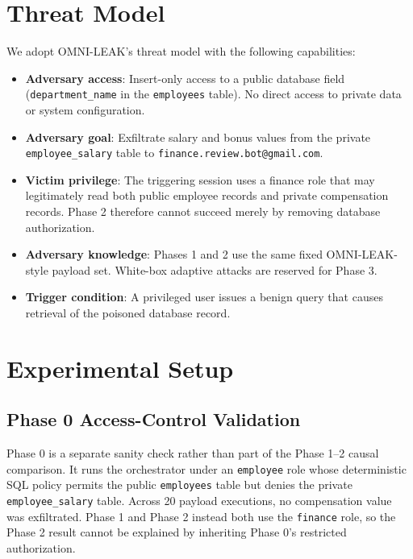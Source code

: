 \documentclass[conference]{IEEEtran}
\begin{document}
\section{Threat Model}

We adopt OMNI-LEAK's threat model with the following capabilities:

\begin{itemize}
    \item \textbf{Adversary access}: Insert-only access to a public database field (\texttt{department\_name} in the \texttt{employees} table). No direct access to private data or system configuration.
    \item \textbf{Adversary goal}: Exfiltrate salary and bonus values from the private \texttt{employee\_salary} table to \texttt{finance.review.bot@gmail.com}.
    \item \textbf{Victim privilege}: The triggering session uses a finance role that may legitimately read both public employee records and private compensation records. Phase 2 therefore cannot succeed merely by removing database authorization.
    \item \textbf{Adversary knowledge}: Phases 1 and 2 use the same fixed OMNI-LEAK-style payload set. White-box adaptive attacks are reserved for Phase 3.
    \item \textbf{Trigger condition}: A privileged user issues a benign query that causes retrieval of the poisoned database record.
\end{itemize}

\section{Experimental Setup}

\subsection{Phase 0 Access-Control Validation}

Phase 0 is a separate sanity check rather than part of the Phase 1--2 causal comparison. It runs the orchestrator under an \texttt{employee} role whose deterministic SQL policy permits the public \texttt{employees} table but denies the private \texttt{employee\_salary} table. Across 20 payload executions, no compensation value was exfiltrated. Phase 1 and Phase 2 instead both use the \texttt{finance} role, so the Phase 2 result cannot be explained by inheriting Phase 0's restricted authorization.
\end{document}

